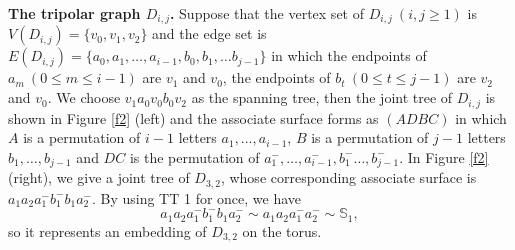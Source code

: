 \documentclass[12pt]{article}
\theoremstyle{definition}
\begin{document}
{\bf The tripolar graph $D_{i,j}$.} Suppose that the vertex set of $D_{i,j}~ (i,j\geq 1)$ is $V(D_{i,j})=\{v_0, v_1, v_2\}$ and the edge set is $E(D_{i,j})=\{a_0, a_1,\ldots, a_{i-1}, b_0, b_1,\ldots b_{j-1}\}$ in which the endpoints of $a_m ~(0\leq m\leq i-1)$ are $v_1$ and $v_0$, the endpoints of $b_t ~(0\leq t\leq j-1)$ are $v_2$ and $v_0$. We choose $v_1a_0v_0b_0v_2$ as the spanning tree, then the joint tree of $D_{i,j}$ is shown in Figure \ref{f2} (left) and the associate surface forms as $(ADBC)$ in which $A$ is a permutation of $i-1$ letters $a_1,\ldots, a_{i-1}$, $B$ is a permutation of $j-1$ letters $b_1,\ldots, b_{j-1}$ and $DC$ is the permutation of $a_1^-,\ldots, a_{i-1}^-, b_1^-\ldots, b_{j-1}^- $. In Figure \ref{f2} (right), we give a joint tree of $D_{3,2}$, whose corresponding associate surface is $a_1a_2a_1^-b_1^-b_1a_2^-$. By using TT 1 for once, we have $$a_1a_2a_1^-b_1^-b_1a_2^-\sim a_1a_2a_1^-a_2^-\sim \mathbb{S}_1,$$ so it represents an embedding of $D_{3,2}$ on the torus.
\end{document}
